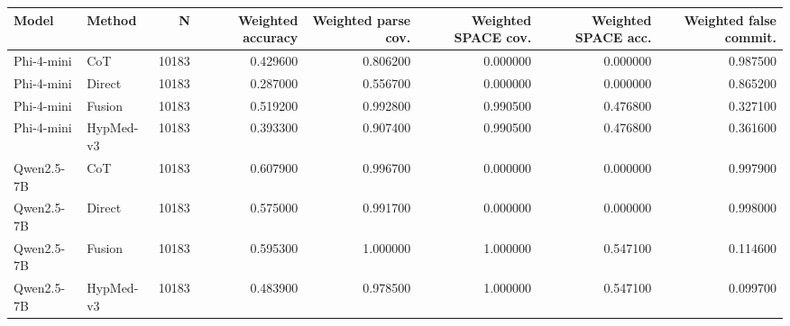 \begin{tabular}{llrrrrrr}
\toprule
Model & Method & N & Weighted accuracy & Weighted parse cov. & Weighted SPACE cov. & Weighted SPACE acc. & Weighted false commit. \\
\midrule
Phi-4-mini & CoT & 10183 & 0.429600 & 0.806200 & 0.000000 & 0.000000 & 0.987500 \\
Phi-4-mini & Direct & 10183 & 0.287000 & 0.556700 & 0.000000 & 0.000000 & 0.865200 \\
Phi-4-mini & Fusion & 10183 & 0.519200 & 0.992800 & 0.990500 & 0.476800 & 0.327100 \\
Phi-4-mini & HypMed-v3 & 10183 & 0.393300 & 0.907400 & 0.990500 & 0.476800 & 0.361600 \\
Qwen2.5-7B & CoT & 10183 & 0.607900 & 0.996700 & 0.000000 & 0.000000 & 0.997900 \\
Qwen2.5-7B & Direct & 10183 & 0.575000 & 0.991700 & 0.000000 & 0.000000 & 0.998000 \\
Qwen2.5-7B & Fusion & 10183 & 0.595300 & 1.000000 & 1.000000 & 0.547100 & 0.114600 \\
Qwen2.5-7B & HypMed-v3 & 10183 & 0.483900 & 0.978500 & 1.000000 & 0.547100 & 0.099700 \\
\bottomrule
\end{tabular}
